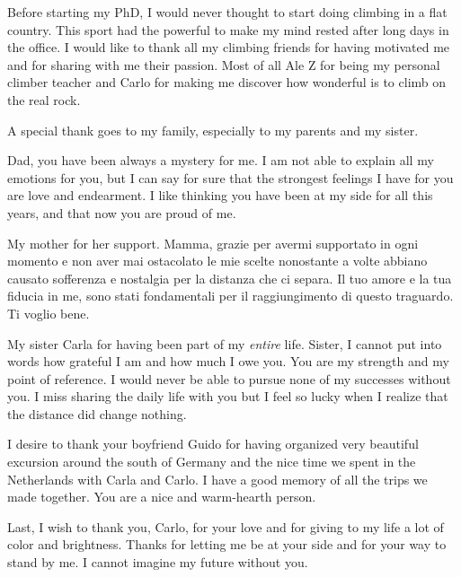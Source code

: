 Before starting my PhD, I would never thought to start doing climbing in a flat country. This sport had the powerful to make my mind rested after long days in the office.
I would like to thank all my climbing friends for having motivated me and for sharing with me their passion. Most of all Ale Z for being my personal climber teacher and Carlo for making me discover how wonderful is to climb on the real rock. 

A special thank goes to my family, especially to my parents and my sister.

Dad, you have been always a mystery for me. I am not able to explain all my emotions for you, but I can say for sure that the strongest feelings I have for you are love and endearment. I like thinking you have been at my side for all this years, and that now you are proud of me.

My mother for her support. Mamma, grazie per avermi supportato in ogni momento e non aver mai ostacolato le mie scelte nonostante a volte abbiano causato sofferenza e nostalgia per la distanza che ci separa. Il tuo amore e la tua fiducia in me, sono stati fondamentali per il raggiungimento di questo traguardo. Ti voglio bene.   

My sister Carla for having been part of my \textit{entire} life. Sister, I cannot put into words how grateful I am and how much I owe you. You are my strength and my point of reference. I would never be able to pursue none of my successes without you.
I miss sharing the daily life with you but I feel so lucky when I realize that the distance did change nothing. 

I desire to thank your boyfriend Guido for having organized very beautiful excursion around the south of Germany and the nice time we spent in the Netherlands with Carla and Carlo. I have a good memory of all the trips we made together. You are a nice and warm-hearth person.

Last, I wish to thank you, Carlo, for your love and for giving to my life a lot of color and brightness. 
Thanks for letting me be at your side and for your way to stand by me. I cannot imagine my future without you.
